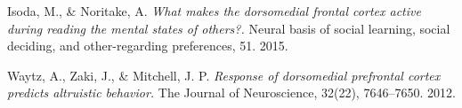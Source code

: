 \documentclass[twocolumn]{article}
\begin{document}
\begin{thebibliography}{9}
  Isoda, M., \& Noritake, A.
  \textit{What makes the dorsomedial frontal cortex active
    during reading the mental states of others?.}
  Neural basis of social learning, social deciding, and other-regarding preferences,
  51. 2015.

  Waytz, A., Zaki, J., \& Mitchell, J. P.
  \textit{Response of dorsomedial prefrontal cortex predicts altruistic behavior.}
  The Journal of Neuroscience, 32(22), 7646–7650. 2012.

\end{thebibliography}
\end{document}
